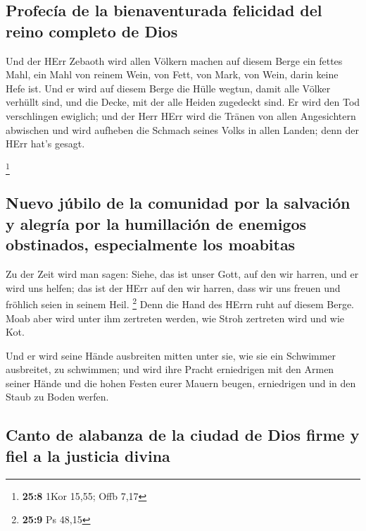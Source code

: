 \hypertarget{profecuxeda-de-la-bienaventurada-felicidad-del-reino-completo-de-dios}{%
\subsection{Profecía de la bienaventurada felicidad del reino completo
de
Dios}\label{profecuxeda-de-la-bienaventurada-felicidad-del-reino-completo-de-dios}}

 Und der HErr Zebaoth wird allen Völkern machen auf diesem
Berge ein fettes Mahl, ein Mahl von reinem Wein, von Fett, von Mark, von
Wein, darin keine Hefe ist.  Und er wird auf diesem Berge
die Hülle wegtun, damit alle Völker verhüllt sind, und die Decke, mit
der alle Heiden zugedeckt sind.  Er wird den Tod
verschlingen ewiglich; und der Herr HErr wird die Tränen von allen
Angesichtern abwischen und wird aufheben die Schmach seines Volks in
allen Landen; denn der HErr hat's gesagt.

\footnote{\textbf{25:8} 1Kor 15,55; Offb 7,17}

\hypertarget{nuevo-juxfabilo-de-la-comunidad-por-la-salvaciuxf3n-y-alegruxeda-por-la-humillaciuxf3n-de-enemigos-obstinados-especialmente-los-moabitas}{%
\subsection{Nuevo júbilo de la comunidad por la salvación y alegría por
la humillación de enemigos obstinados, especialmente los
moabitas}\label{nuevo-juxfabilo-de-la-comunidad-por-la-salvaciuxf3n-y-alegruxeda-por-la-humillaciuxf3n-de-enemigos-obstinados-especialmente-los-moabitas}}

 Zu der Zeit wird man sagen: Siehe, das ist unser Gott,
auf den wir harren, und er wird uns helfen; das ist der HErr auf den wir
harren, dass wir uns freuen und fröhlich seien in seinem Heil.
\footnote{\textbf{25:9} Ps 48,15}  Denn die Hand des
HErrn ruht auf diesem Berge. Moab aber wird unter ihm zertreten werden,
wie Stroh zertreten wird und wie Kot.

 Und er wird seine Hände ausbreiten mitten unter sie, wie
sie ein Schwimmer ausbreitet, zu schwimmen; und wird ihre Pracht
erniedrigen mit den Armen seiner Hände  und die hohen
Festen eurer Mauern beugen, erniedrigen und in den Staub zu Boden
werfen.

\hypertarget{canto-de-alabanza-de-la-ciudad-de-dios-firme-y-fiel-a-la-justicia-divina}{%
\subsection{Canto de alabanza de la ciudad de Dios firme y fiel a la
justicia
divina}\label{canto-de-alabanza-de-la-ciudad-de-dios-firme-y-fiel-a-la-justicia-divina}}

